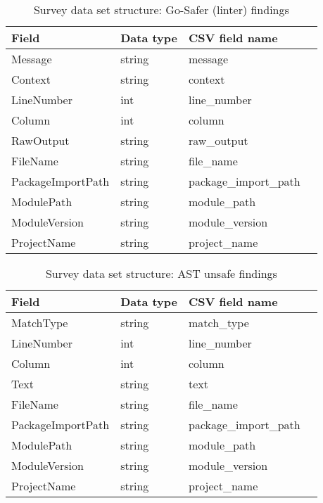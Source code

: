 \begin{table}[h]
    \centering
    \caption{Survey data set structure: Go-Safer (linter) findings}
    \label{tbl:datastructure-linter-findings}
    \begin{tabular}{llll}
        \toprule
        Field & Data type & CSV field name \\
        \midrule
        Message              & string & message \\
        Context              & string & context \\
        LineNumber           & int    & line\_number \\
        Column               & int    & column \\
        RawOutput            & string & raw\_output \\
        FileName             & string & file\_name \\
        PackageImportPath    & string & package\_import\_path \\
        ModulePath           & string & module\_path \\
        ModuleVersion        & string & module\_version \\
        ProjectName          & string & project\_name \\
        \bottomrule
    \end{tabular}
\end{table}

\begin{table}[h]
    \centering
    \caption{Survey data set structure: AST unsafe findings}
    \label{tbl:datastructure-ast-findings}
    \begin{tabular}{llll}
        \toprule
        Field & Data type & CSV field name \\
        \midrule
        MatchType            & string & match\_type \\
        LineNumber           & int    & line\_number \\
        Column               & int    & column \\
        Text                 & string & text \\
        FileName             & string & file\_name \\
        PackageImportPath    & string & package\_import\_path \\
        ModulePath           & string & module\_path \\
        ModuleVersion        & string & module\_version \\
        ProjectName          & string & project\_name \\
        \bottomrule
    \end{tabular}
\end{table}

